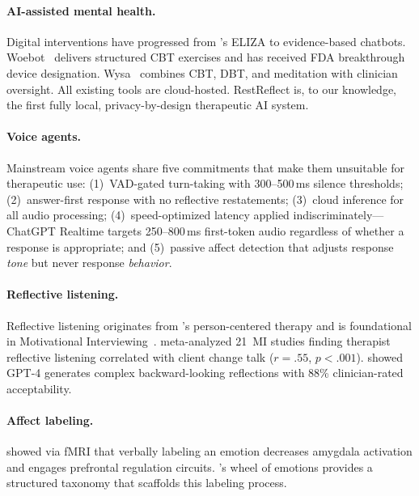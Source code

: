 \documentclass{article}
\begin{document}
\paragraph{AI-assisted mental health.} Digital interventions have progressed from \citet{weizenbaum1966eliza}'s ELIZA to evidence-based chatbots. Woebot~\citep{fitzpatrick2017woebot} delivers structured CBT exercises and has received FDA breakthrough device designation. Wysa~\citep{inkster2018wysa} combines CBT, DBT, and meditation with clinician oversight. All existing tools are cloud-hosted. RestReflect is, to our knowledge, the first fully local, privacy-by-design therapeutic AI system.

\paragraph{Voice agents.} Mainstream voice agents share five commitments that make them unsuitable for therapeutic use: (1)~VAD-gated turn-taking with 300--500\,ms silence thresholds; (2)~answer-first response with no reflective restatements; (3)~cloud inference for all audio processing; (4)~speed-optimized latency applied indiscriminately---ChatGPT Realtime targets 250--800\,ms first-token audio regardless of whether a response is appropriate; and (5)~passive affect detection that adjusts response \emph{tone} but never response \emph{behavior}.

\paragraph{Reflective listening.} Reflective listening originates from \citet{rogers1957necessary}'s person-centered therapy and is foundational in Motivational Interviewing~\citep{miller2013motivational}. \citet{magill2018meta} meta-analyzed 21~MI studies finding therapist reflective listening correlated with client change talk ($r = .55$, $p < .001$). \citet{kumar2024gpt4} showed GPT-4 generates complex backward-looking reflections with 88\% clinician-rated acceptability.

\paragraph{Affect labeling.} \citet{lieberman2007putting} showed via fMRI that verbally labeling an emotion decreases amygdala activation and engages prefrontal regulation circuits. \citet{plutchik1980general}'s wheel of emotions provides a structured taxonomy that scaffolds this labeling process.
\end{document}

